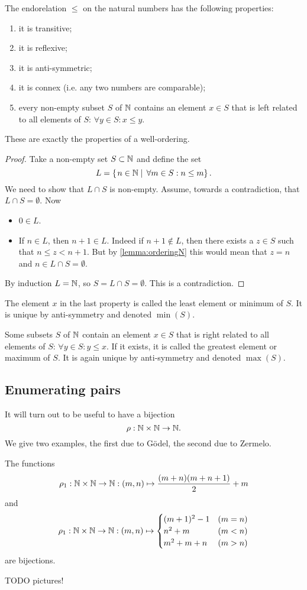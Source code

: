 \begin{proposition} \label{proposition:wellOrderingN}
The endorelation $\leq$ on the natural numbers has the following properties:
\begin{enumerate}
\item it is transitive;
\item it is reflexive;
\item it is anti-symmetric;
\item it is connex (i.e. any two numbers are comparable);
\item every non-empty subset $S$ of $\mathbb{N}$ contains an element $x\in S$ that is left related to all elements of $S$: $\forall y\in S: x\leq y$.
\end{enumerate}
These are exactly the properties of a well-ordering.
\end{proposition}
\begin{proof}
Take a non-empty set $S\subset \mathbb{N}$ and define the set
\[ L = \left\{\left. n\in\mathbb{N} \;\right|\; \forall m\in S: n\leq m \right\}. \]
We need to show that $L\cap S$ is non-empty. Assume, towards a contradiction, that $L\cap S = \emptyset$.
Now
\begin{itemize}
\item $0\in L$.
\item If $n\in L$, then $n+1\in L$. Indeed if $n+1 \notin L$, then there exists a $z\in S$ such that $n\leq z<n+1$. But by \ref{lemma:orderingN} this would mean that $z=n$ and $n\in L\cap S = \emptyset$.
\end{itemize}
By induction $L=\mathbb{N}$, so $S = L\cap S = \emptyset$. This is a contradiction.
\end{proof}


The element $x$ in the last property is called the least element or minimum of $S$. It is unique by anti-symmetry and denoted $\min(S)$.

Some subsets $S$ of $\mathbb{N}$ contain an element $x\in S$ that is right related to all elements of $S$: $\forall y\in S: y\leq x$. If it exists, it is called the greatest element or maximum of $S$. It is again unique by anti-symmetry and denoted $\max(S)$.

\subsection{Enumerating pairs}
It will turn out to be useful to have a bijection
\[ \rho: \mathbb{N}\times \mathbb{N} \to \mathbb{N}. \]
We give two examples, the first due to Gödel, the second due to Zermelo.
\begin{lemma} \label{lemma:pairEnumeration}
The functions
\[\rho_1 : \mathbb{N}\times\mathbb{N} \to \mathbb{N}: (m,n)\mapsto \frac{(m+n)(m+n+1)}{2}+m \]
and
\[ \rho_1 : \mathbb{N}\times\mathbb{N} \to \mathbb{N}: (m,n)\mapsto \begin{cases}
(m+1)^2-1 & (m=n) \\
n^2 + m & (m<n) \\
m^2+m+n & (m>n)
\end{cases} \]
are bijections.
\end{lemma}
TODO pictures!
